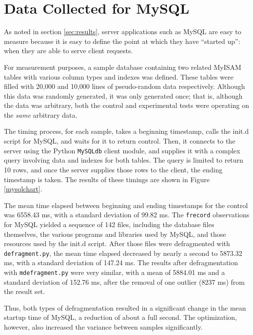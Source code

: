 \documentclass[10pt,twocolumn,letterpaper]{article}
\begin{document}
\section{Data Collected for MySQL}

As noted in section \ref{sec:results}, server applications such as MySQL are easy to measure because it is easy to define the point at which they have ``started up'': when they are able to serve client requests.

For measurement purposes, a sample database containing two related MyISAM tables with various column types and indexes was defined. These tables were filled with 20,000 and 10,000 lines of pseudo-random data respectively. Although this data was randomly generated, it was only generated once; that is, although the data was arbitrary, both the control and experimental tests were operating on the \emph{same} arbitrary data.

The timing process, for each sample, takes a beginning timestamp, calls the init.d script for MySQL, and waits for it to return control. Then, it connects to the server using the Python \texttt{MySQLdb} client module, and supplies it with a complex query involving data and indexes for both tables. The query is limited to return 10 rows, and once the
server supplies those rows to the client, the ending timestamp is taken. The results of these timings are shown in Figure \ref{mysqlchart}.

The mean time elapsed between beginning and ending timestamps for the control was 6558.43 ms, with a standard deviation of 99.82 ms. The \texttt{frecord} observations for MySQL yielded a sequence of 142 files, including the database files themselves, the various programs and libraries used by MySQL, and those resources used by the init.d script. After those files were defragmented with \texttt{defragment.py}, the mean time elapsed decreased by nearly a second to 5873.32 ms, with a standard deviation of 147.24 ms. The results after defragmentation with \texttt{mdefragment.py} were very similar, with a mean of 5884.01 ms and a standard deviation of 152.76 ms, after the removal of one outlier (8237 ms) from the result set.

Thus, both types of defragmentation resulted in a significant change in the mean startup time of MySQL, a reduction of about a full second. The optimization, however, also increased the variance between samples significantly.
\end{document}
